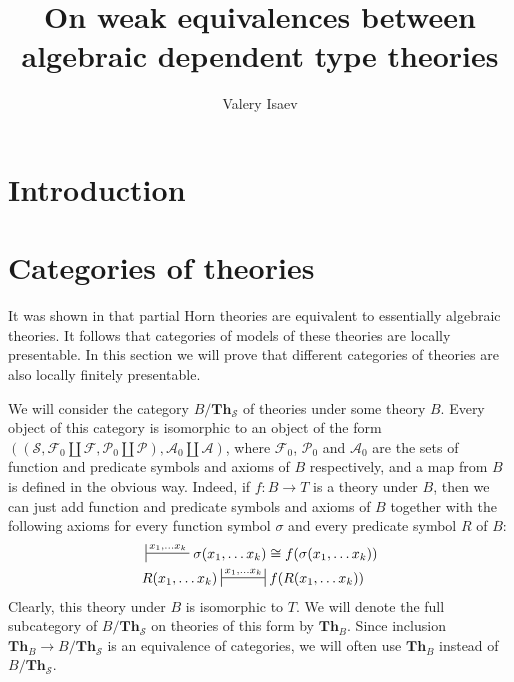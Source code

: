 \documentclass[reqno]{amsart}
\theoremstyle{definition}
\theoremstyle{remark}
\newcommand{\cat}[1]{\mathbf{#1}}
\newcommand{\Th}{\cat{Th}}
\numberwithin{figure}{section}
\begin{document}
\title{On weak equivalences between algebraic dependent type theories}

\author{Valery Isaev}

\begin{abstract}
\end{abstract}

\maketitle

 \makeatletter
    \providecommand\@dotsep{5}
  \makeatother
  \listoftodos\relax

\section{Introduction}

\section{Categories of theories}

It was shown in \cite{PHL} that partial Horn theories are equivalent to essentially algebraic theories.
It follows that categories of models of these theories are locally presentable.
In this section we will prove that different categories of theories are also locally finitely presentable.

We will consider the category $B/\Th_\mathcal{S}$ of theories under some theory $B$.
Every object of this category is isomorphic to an object of the form
$((\mathcal{S}, \mathcal{F}_0 \amalg \mathcal{F}, \mathcal{P}_0 \amalg \mathcal{P}), \mathcal{A}_0 \amalg \mathcal{A})$,
where $\mathcal{F}_0$, $\mathcal{P}_0$ and $\mathcal{A}_0$ are the sets of function and predicate symbols and axioms of $B$ respectively,
and a map from $B$ is defined in the obvious way.
Indeed, if $f : B \to T$ is a theory under $B$, then we can just add function and predicate symbols and axioms of $B$
together with the following axioms for every function symbol $\sigma$ and every predicate symbol $R$ of $B$:
\begin{align*}
& \sststile{}{x_1, \ldots x_k} \sigma(x_1, \ldots x_k) \cong f(\sigma(x_1, \ldots x_k)) \\
& R(x_1, \ldots x_k) \ssststile{}{x_1, \ldots x_k} f(R(x_1, \ldots x_k))
\end{align*}
Clearly, this theory under $B$ is isomorphic to $T$.
We will denote the full subcategory of $B/\Th_\mathcal{S}$ on theories of this form by $\Th_B$.
Since inclusion $\Th_B \to B/\Th_\mathcal{S}$ is an equivalence of categories, we will often use $\Th_B$ instead of $B/\Th_\mathcal{S}$.
\end{document}
